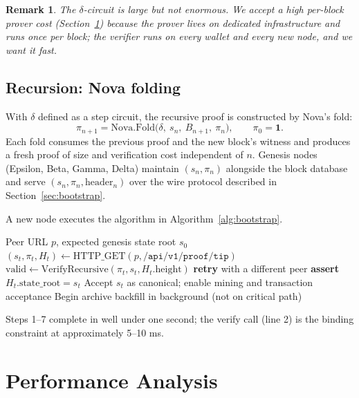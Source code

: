 \documentclass[11pt,a4paper]{article}
\newtheorem{remark}{Remark}
\begin{document}
\begin{remark}
\label{rem:perblockfreshness}
The $\delta$-circuit is large but not enormous. We accept a high per-block
prover cost (Section~\ref{sec:performance}) because the prover lives
on dedicated infrastructure and runs once per block; the verifier runs
on every wallet and every new node, and we want it fast.
\end{remark}

\subsection{Recursion: Nova folding}

With $\delta$ defined as a step circuit, the recursive proof is
constructed by Nova's fold:
\[
  \pi_{n+1} = \mathrm{Nova.Fold}\big(\delta,\ s_n,\ B_{n+1},\ \pi_n\big),
  \qquad \pi_0 = \mathbf{1}.
\]
Each fold consumes the previous proof and the new block's witness and
produces a fresh proof of size and verification cost independent of $n$.
Genesis nodes (Epsilon, Beta, Gamma, Delta) maintain
$(s_n, \pi_n)$ alongside the block database and serve
$(s_n, \pi_n, \mathrm{header}_n)$ over the wire protocol described in
Section~\ref{sec:bootstrap}.

A new node executes the algorithm in Algorithm~\ref{alg:bootstrap}.

\begin{algorithm}[t]
\caption{Proof-bootstrap of a fresh node}
\label{alg:bootstrap}
\begin{algorithmic}[1]
\Require Peer URL $p$, expected genesis state root $s_0$
\State $(s_t, \pi_t, H_t) \gets \mathrm{HTTP\_GET}(p, \mathtt{/api/v1/proof/tip})$
\State $\mathrm{valid} \gets \mathrm{VerifyRecursive}(\pi_t, s_t, H_t.\mathrm{height})$
  \State \textbf{retry} with a different peer
\EndIf
\State \textbf{assert} $H_t.\mathrm{state\_root} = s_t$
\State Accept $s_t$ as canonical; enable mining and transaction acceptance
\State Begin archive backfill in background (not on critical path)
\end{algorithmic}
\end{algorithm}

Steps 1--7 complete in well under one second; the verify call (line 2)
is the binding constraint at approximately 5--10 ms.

\section{Performance Analysis}
\label{sec:performance}
\end{document}

